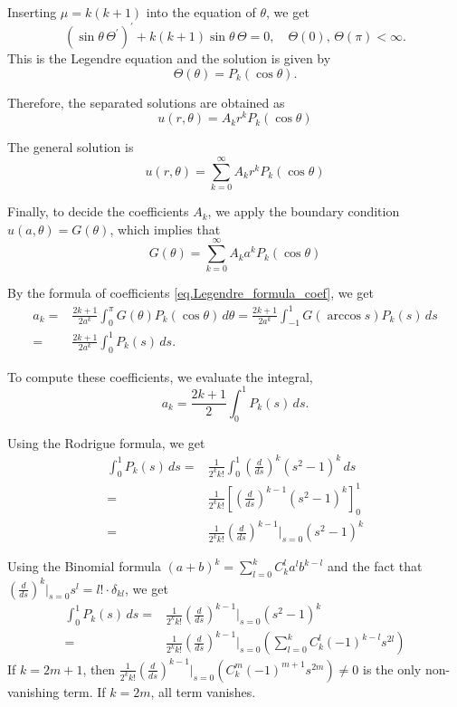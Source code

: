 Inserting $\mu = k(k+1)$ into the equation of $\theta$, we get 
\begin{equation}
    (\sin\theta\,\Theta^{\prime})^{\prime}+k(k+1) \sin\theta\,\Theta=0, \quad \Theta(0),\, \Theta(\pi)  < \infty.
\end{equation}
This is the Legendre equation and the solution is given by 
\begin{equation}
    \Theta(\theta) = P_k(\cos\theta).
\end{equation}

Therefore, the separated solutions are obtained as
\begin{equation}
u(r, \theta)= A_k r^k P_k(\cos\theta)
\end{equation}

The general solution is
$$
u(r, \theta)=\sum_{k = 0}^\infty A_k r^k P_k(\cos\theta)
$$

Finally, to decide the coefficients $A_k$, we apply the boundary condition $u(a, \theta)=G(\theta)$, which implies that 
$$
G(\theta)=\sum_{k = 0}^\infty A_k a^k P_k(\cos\theta)
$$

By the formula of coefficients \eqref{eq.Legendre_formula_coef}, we get 
\[
\begin{split}
    a_k =& \frac{2k + 1}{2a^k} \int_0^\pi G(\theta) P_k(\cos \theta) \, d\theta = \frac{2k + 1}{2a^k} \int_{-1}^1 G(\arccos s) P_k(s) \, ds
    \\
    =&\frac{2k + 1}{2a^k} \int_0^1 P_k(s) \, ds.
\end{split}
\]

To compute these coefficients, we evaluate the integral,
\[
a_k = \frac{2k + 1}{2} \int_0^1 P_k(s) \, ds.
\]

Using the Rodrigue formula, we get 
\[
\begin{split}
    \int_0^1 P_{k}(s) \, ds =& \frac{1}{2^{k} k!} \int_0^1 \left(\frac{d}{d s}\right)^{k}\left(s^2-1\right)^{k} \, ds 
    \\
    =& \frac{1}{2^{k} k!} \left[\left(\frac{d}{d s}\right)^{k-1}\left(s^2-1\right)^{k}\right]_0^1 
    \\
    =& \frac{1}{2^{k} k!} \left(\frac{d}{d s}\right)^{k-1}\bigg|_{s = 0}\left(s^2-1\right)^{k}
\end{split}
\]

Using the Binomial formula $(a + b)^k = \sum_{l = 0}^k C_k^l a^l b^{k - l}$ and the fact that $\left(\frac{d}{d s}\right)^k\Big|_{s = 0} s^l = l!\cdot \delta_{kl}$, we get 
\[
\begin{split}
    \int_0^1 P_{k}(s) \, ds
    =& \frac{1}{2^{k} k!} \left(\frac{d}{d s}\right)^{k-1}\bigg|_{s = 0}\left(s^2-1\right)^{k}
    \\
    =& \frac{1}{2^{k} k!} \left(\frac{d}{d s}\right)^{k-1}\bigg|_{s = 0}\left(\sum_{l = 0}^{k} C_{k}^l (-1)^{k-l}s^{2l}\right)
\end{split}
\]
If $k = 2m + 1$, then $\frac{1}{2^{k} k!} \left(\frac{d}{d s}\right)^{k-1}\bigg|_{s = 0}\left(C_{k}^{m} (-1)^{m+1}s^{2m}\right)\neq 0$ is the only non-vanishing term. If $k = 2m$, all term vanishes.

